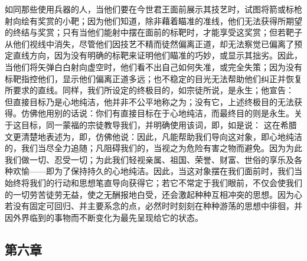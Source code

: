 如同那些使用兵器的人，当他们要在今世君王面前展示其技艺时，试图将箭或标枪射向绘有奖赏的小靶；因为他们知道，除非藉着瞄准的准线，他们无法获得所期望的终结与奖赏；只有当他们能射中摆在面前的标靶时，才能享受这奖赏；但若靶子从他们视线中消失，尽管他们因技艺不精而徒然偏离正道，却无法察觉已偏离了预定直线方向，因为没有明确的标靶来证明他们瞄准的巧妙，或显示其拙劣。因此，当他们将矢弹白白射向虚空时，他们看不出自己如何失准，或完全失策；因为没有标靶指控他们，显示他们偏离正道多远；也不稳定的目光无法帮助他们纠正并恢复所要求的直线。同样，我们所设定的终极目的，如宗徒所说，是永生；他宣告： 但直接目标乃是心地纯洁，他并非不公平地称之为；没有它，上述终极目的无法获得。仿佛他用别的话说：你们有直接目标在于心地纯洁，而最终目的则是永生。关于这目标，同一蒙福的宗徒教导我们，并明确使用该词，即，如是说： 这在希腊文更清楚地表述为，即，仿佛他说：因此，凡能帮助我们导向这对象，即心地纯洁的，我们当尽全力追随；凡阻碍我们的，当视之为危险有害之物而避免。因为为此我们做一切、忍受一切；为此我们轻视亲属、祖国、荣誉、财富、世俗的享乐及各种欢愉——即为了保持持久的心地纯洁。因此，当这对象摆在我们面前时，我们当始终将我们的行动和思想笔直导向获得它；若它不常定于我们眼前，不仅会使我们的一切劳苦徒劳无益，使之无酬报地白受，还会激起种种互相冲突的思想。因为心若没有固定可回归、并主要系念的点，必然时时刻刻在种种游荡的思想中徘徊，并因外界临到的事物而不断变化为最先呈现给它的状态。\par


\subsection{第六章}

\par

